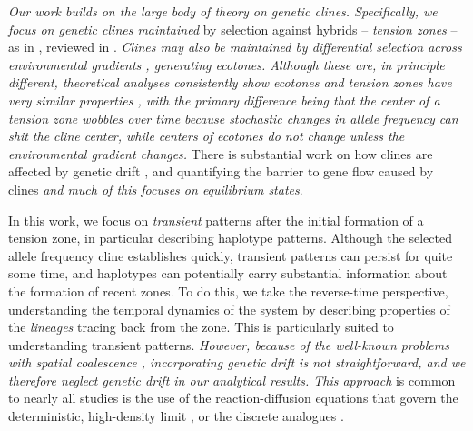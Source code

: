 \documentclass[11pt,letterpaper]{article}
\newcommand{\alisa}[1]{{\em \color{red} #1}}
\newcommand{\plr}[1]{{\em \color{blue} #1}}
\newcommand{\yb}[1]{{\em \color{magenta} #1}}
\begin{document}
\yb{Our work builds on the large body of theory on genetic clines. Specifically,  
we focus on genetic clines maintained} by selection against hybrids -- \emph{tension zones} --
as in \citet{Bazykin1969}, reviewed in \citet{Barton1985}. 
\yb{Clines may also be maintained by differential selection across environmental gradients \citep{Haldane1948,fisher1950frequencies}, generating \emph{ecotones}. 
Although these are, in principle different, theoretical analyses consistently show ecotones and tension zones have very similar properties \citep{Slatkin1973, barton1986barrier,Kruuk1999}, with the primary difference being that the center of a tension zone wobbles over time \citep{Barton1979a} because stochastic changes in allele frequency can shit the cline center, while centers of ecotones do not change unless the environmental gradient changes. } 
There is substantial work on how clines are affected by genetic drift \citep{Slatkin1975,felsenstein1975genetic,barton2008effect,Polechova2011},
and quantifying the barrier to gene flow caused by clines \citep{barton1979gene,Barton1989,Barton1993,Barton2000} \alisa{and much of this focuses on equilibrium states}.

In this work, we focus on \emph{transient} patterns after the initial formation of a tension zone,
in particular describing haplotype patterns.
Although the selected allele frequency cline establishes quickly, transient patterns can persist for quite some time,
and  haplotypes can potentially carry substantial information about the formation of recent zones.
To do this, we take the reverse-time perspective,
understanding the temporal dynamics of the system by describing properties of the \emph{lineages} tracing back from the zone.
This is particularly suited to understanding transient patterns.  
\yb{However, because of the well-known problems with spatial coalescence \citep{felsenstein1975pain,barton2002continuous},
incorporating genetic drift is not straightforward, and we therefore neglect genetic drift in our analytical results.   
This approach} is common to nearly all studies is the use of the
reaction-diffusion equations that govern the deterministic, high-density limit \citep[as in][]{Nagylaki1975},
or the discrete analogues \citep{hanson1966effects}.
\end{document}
